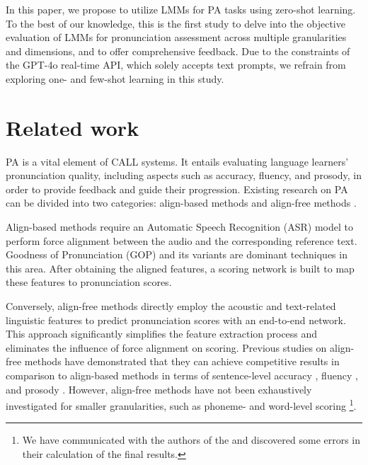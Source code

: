 \documentclass{Interspeech}
\begin{document}
In this paper, we propose to utilize LMMs for PA tasks using zero-shot learning. To the best of our knowledge, this is the first study to delve into the objective evaluation of LMMs for pronunciation assessment across multiple granularities and dimensions, and to offer comprehensive feedback. Due to the constraints of the GPT-4o real-time API, which solely accepts text prompts, we refrain from exploring one- and few-shot learning in this study.

\section{Related work}

PA is a vital element of CALL systems. It entails evaluating language learners' pronunciation quality, including aspects such as accuracy, fluency, and prosody, in order to provide feedback and guide their progression. Existing research on PA can be divided into two categories: align-based methods \cite{witt2000phone,wang2012improved,hu2015improved,mao2019nn,gong2022transformer,chao2023hierarchical} and align-free methods \cite{fu2024pronunciation,kim2022automatic,liu2023asr,liang2023end}.

Align-based methods require an Automatic Speech Recognition (ASR) model to perform force alignment between the audio and the corresponding reference text. Goodness of Pronunciation (GOP) \cite{witt2000phone} and its variants \cite{wang2012improved,hu2015improved} are dominant techniques in this area. After obtaining the aligned features, a scoring network is built to map these features to pronunciation scores.

Conversely, align-free methods directly employ the acoustic and text-related linguistic features to predict pronunciation scores with an end-to-end network. This approach significantly simplifies the feature extraction process and eliminates the influence of force alignment on scoring. Previous studies on align-free methods have demonstrated that they can achieve competitive results in comparison to align-based methods in terms of sentence-level accuracy \cite{fu2024pronunciation}, fluency \cite{fu2024pronunciation,kim2022automatic,liu2023asr}, and prosody \cite{kim2022automatic}. However, align-free methods have not been exhaustively investigated for smaller granularities, such as phoneme- and word-level scoring \footnote{We have communicated with the authors of the \cite{liang2023end} and discovered some errors in their calculation of the final results.}.
\end{document}
